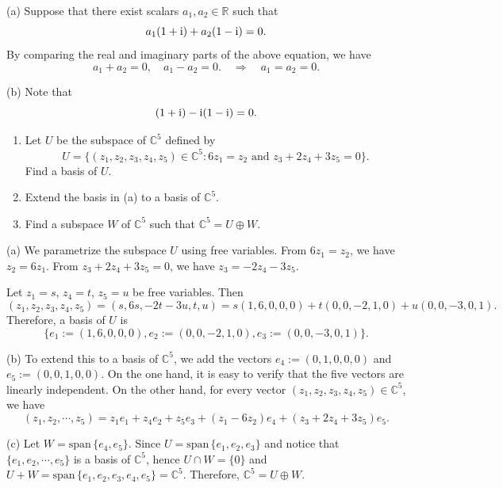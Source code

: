 \documentclass{article}
\newcommand{\sspan}{\text{span}\,}
\begin{document}
\begin{solution}
    (a) Suppose that there exist scalars \( a_1, a_2 \in \mathbb{R} \) such that
    \[ a_1 (1 + \mathrm{i}) + a_2 (1 - \mathrm{i}) = 0. \]
    By comparing the real and imaginary parts of the above equation, we have
    \[ a_1+a_2=0,\quad a_1-a_2=0.\quad\Rightarrow\quad a_1=a_2=0. \]\par 
    (b) Note that
    \[ (1+\mathrm{i}) -\mathrm{i} (1-\mathrm{i})=0. \]
\end{solution}

\begin{problem}[2B-4]
    \begin{enumerate}[label=(\alph*)]
        \item Let \( U \) be the subspace of \( \mathbb{C}^5 \) defined by
        \[
        U = \{ (z_1, z_2, z_3, z_4, z_5) \in \mathbb{C}^5 : 6z_1 = z_2 \text{ and } z_3 + 2z_4 + 3z_5 = 0 \}.
        \]
        Find a basis of \( U \).

        \item Extend the basis in (a) to a basis of \( \mathbb{C}^5 \).

        \item Find a subspace \( W \) of \( \mathbb{C}^5 \) such that \( \mathbb{C}^5 = U \oplus W \).
    \end{enumerate}
\end{problem}

\begin{solution}
    (a) We parametrize the subspace $U$ using free variables. From $6z_1 = z_2$, we have $z_2 = 6z_1$. From $z_3 + 2z_4 + 3z_5 = 0$, we have $z_3 = -2z_4 - 3z_5$. 

Let $z_1 = s$, $z_4 = t$, $z_5 = u$ be free variables. Then
\[ (z_1, z_2, z_3, z_4, z_5) = (s, 6s, -2t - 3u, t, u) = s(1, 6, 0, 0, 0) + t(0, 0, -2, 1, 0) + u(0, 0, -3, 0, 1). \]
Therefore, a basis of $U$ is
\[ \{ e_1:=(1, 6, 0, 0, 0), e_2:=(0, 0, -2, 1, 0), e_3:=(0, 0, -3, 0, 1) \}. \]

    (b) To extend this to a basis of $\mathbb{C}^5$, we add the vectors $e_4:=(0, 1, 0, 0, 0)$ and $e_5:=(0, 0, 1, 0, 0)$. On the one hand, it is easy to verify that the five vectors are linearly independent. On the other hand, for every vector $(z_1, z_2, z_3, z_4, z_5) \in \mathbb{C}^5$, we have
    \[ (z_1,z_2,\cdots,z_5)=z_1e_1+z_4e_2+z_5e_3+(z_1-6z_2)e_4+(z_3+2z_4+3z_5)e_5. \] 

    (c) Let $W = \sspan\{ e_4,e_5 \}$. Since $ U=\sspan\{e_1,e_2,e_3\} $ and notice that $ \{e_1,e_2,\cdots,e_5\} $ is a basis of $ \mathbb{C}^5 $, hence $ U\cap W=\{0\} $ and $ U+W=\sspan\{e_1,e_2,e_3,e_4,e_5\} = \mathbb{C}^5 $. Therefore, $ \mathbb{C}^5=U\oplus W $.
\end{solution}
\end{document}
